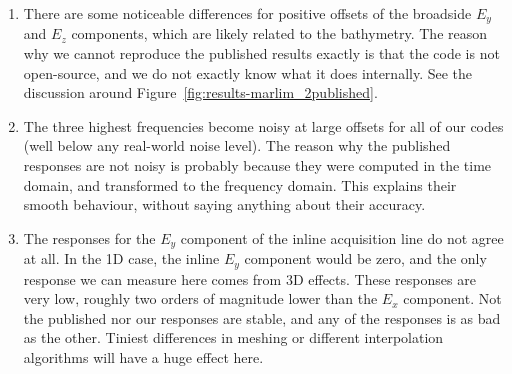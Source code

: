 \documentclass[onecolumn,extra,camera]{gji}
\begin{document}
\begin{enumerate}
  \item There are some noticeable differences for positive offsets of the broadside $E_y$ and $E_z$ components, which are likely related to the bathymetry. The reason why we cannot reproduce the published results exactly is that the code is not open-source, and we do not exactly know what it does internally. See the discussion around Figure~\ref{fig:results-marlim_2published}.
  \item The three highest frequencies become noisy at large offsets for all of our codes (well below any real-world noise level). The reason why the published responses are not noisy is probably because they were computed in the time domain, and transformed to the frequency domain. This explains their smooth behaviour, without saying anything about their accuracy.
  \item The responses for the $E_y$ component of the inline acquisition line do not agree at all. In the 1D case, the inline $E_y$ component would be zero, and the only response we can measure here comes from 3D effects. These responses are very low, roughly two orders of magnitude lower than the $E_x$ component. Not the published nor our responses are stable, and any of the responses is as bad as the other. Tiniest differences in meshing or different interpolation algorithms will have a huge effect here.
\end{enumerate}
\end{document}
